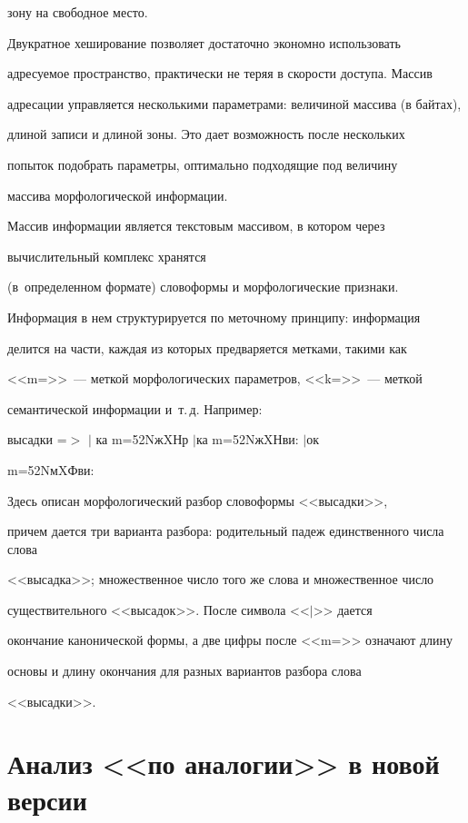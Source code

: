 зону на свободное место.



    Двукратное хеширование позволяет достаточно экономно использовать

адресуемое пространство, практически не теряя в скорости доступа. Массив

адресации управляется несколькими параметрами: величиной массива (в байтах),

длиной записи и длиной зоны. Это дает возможность после нескольких

попыток подобрать параметры, оптимально подходящие под величину

массива морфологической информации.



    Массив информации является текстовым массивом, в котором через

    вы\-чис\-ли\-тельный комплекс хранятся

(в~определенном формате) словоформы и морфологические признаки.

Информация в нем структурируется по меточному принципу: информация

делится на части, каждая из которых предваряется метками, такими как

<<m=>>~--- меткой морфологических параметров, <<k=>>~--- меткой

семантической информации и~т.\,д. Например:



    высадки =$>$ $\vert$ ка m=52NжXНр $\vert$ка m=52NжXНви: $\vert$ок

m=52NмXФви:



    Здесь описан морфологический разбор словоформы <<высадки>>,

причем дается три варианта разбора: родительный падеж единственного числа слова

<<высадка>>; множественное число того же слова и множественное число

существительного <<высадок>>. После символа <<$\vert$>> дается

окончание канонической формы, а две цифры после <<m=>> означают длину

основы и длину окончания для разных вариантов разбора слова

<<высадки>>.



\section{Анализ <<по аналогии>> в новой версии}




